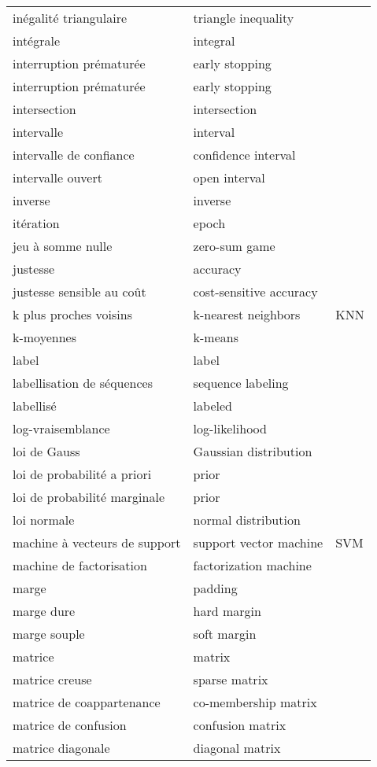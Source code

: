 \begin{longtable}{p{} p{} p{}}
inégalité triangulaire & triangle inequality &  \\ 
intégrale & integral &  \\ 
interruption prématurée & early stopping &  \\ 
interruption prématurée & early stopping &  \\ 
intersection & intersection &  \\ 
intervalle & interval &  \\ 
intervalle de confiance & confidence interval &  \\ 
intervalle ouvert & open interval &  \\ 
inverse & inverse &  \\ 
itération & epoch &  \\ 
jeu à somme nulle & zero-sum game &  \\ 
justesse & accuracy &  \\ 
justesse sensible au coût & cost-sensitive accuracy &  \\ 
k plus proches voisins & k-nearest neighbors & KNN \\ 
k-moyennes & k-means &  \\ 
label & label &  \\ 
labellisation de séquences & sequence labeling &  \\ 
labellisé & labeled &  \\ 
log-vraisemblance & log-likelihood &  \\ 
loi de Gauss & Gaussian distribution &  \\ 
loi de probabilité a priori & prior &  \\ 
loi de probabilité marginale & prior &  \\ 
loi normale & normal distribution &  \\ 
machine à vecteurs de support & support vector machine & SVM \\ 
machine de factorisation & factorization machine &  \\ 
marge & padding &  \\ 
marge dure & hard margin &  \\ 
marge souple & soft margin &  \\ 
matrice & matrix &  \\ 
matrice creuse & sparse matrix &  \\ 
matrice de coappartenance & co-membership matrix &  \\ 
matrice de confusion & confusion matrix &  \\ 
matrice diagonale & diagonal matrix &  \\ 

\end{longtable}

